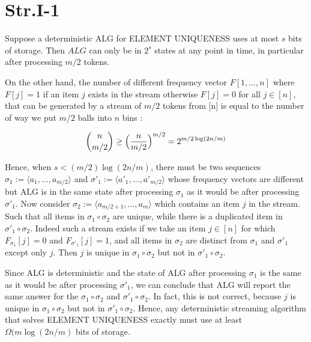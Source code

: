 
\section*{Str.I-1}

Suppose a deterministic ALG for ELEMENT UNIQUENESS uses at most $s$ bits of storage. Then $ALG$ can only be in $2^s$ states at any point in time, in particular after processing $m/2$ tokens.

On the other hand, the number of different frequency vector $F[1,...,n]$ where $F[j] = 1$ if an item $j$ exists in the stream otherwise $F[j] = 0$ for all $j \in [n]$, that can be generated by a stream of $m/2$ tokens from [n] is equal to the number of way we put $m/2$ balls into $n$ bins :

\begin{align*}
\dbinom{n}{m/2} \ge \Big( \frac{n}{m/2} \Big)^{m/2} = 2^{m/2\log(2n/m)}
\end{align*}

Hence, when $s < (m/2)\log(2n/m)$, there must be two sequences $\sigma_1 :=  \langle a_1, \dotsc , a_{m/2} \rangle$ and $\sigma{'}_1 := \langle a{'}_1, \dotsc , a{'}_{m/2} \rangle$ whose frequency vectors are different but ALG is in the same state after processing $\sigma_1$ as it would be after processing $\sigma{'}_{1}$. Now consider $\sigma_2 := \langle a_{m/2+1}, \dotsc, a_m \rangle$  which contains an item $j$ in the stream. Such that all items in $\sigma_1 \circ \sigma_2$ are unique, while there is a duplicated item in $\sigma'_1 \circ \sigma_2$. Indeed such a stream exists if we take an item $j \in [n]$ for which $F_{\sigma_{1}}[j] = 0$ and $F_{\sigma'_{1}}[j] = 1$, and all items in $\sigma_2$ are distinct from $\sigma_1$ and $\sigma'_1$ except only $j$. Then $j$ is unique in $\sigma_1 \circ \sigma_2$ but not in $\sigma'_1 \circ \sigma_2$.

Since ALG is deterministic and the state of ALG after processing $\sigma_1$ is the same as it would be after processing $\sigma'_1$, we can conclude that ALG will report the same answer for the $\sigma_1 \circ \sigma_2$ and $\sigma'_1 \circ \sigma_2$. In fact, this is not correct, because $j$ is unique in $\sigma_1 \circ \sigma_2$ but not in $\sigma'_1 \circ \sigma_2$. Hence, any deterministic streaming algorithm that solves ELEMENT UNIQUENESS exactly must use at least $\Omega(m\log(2n/m)$ bits of storage.

